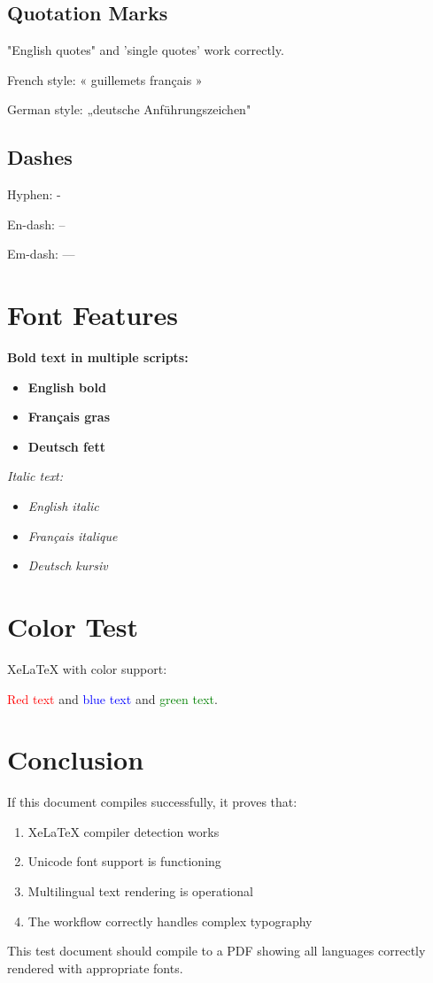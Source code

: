 \documentclass[12pt,a4paper]{article}
\begin{document}
\subsection{Quotation Marks}
"English quotes" and 'single quotes' work correctly.

French style: « guillemets français »

German style: „deutsche Anführungszeichen"

\subsection{Dashes}
Hyphen: -

En-dash: --

Em-dash: ---

\section{Font Features}

\textbf{Bold text in multiple scripts:}
\begin{itemize}
    \item \textbf{English bold}
    \item \textbf{Français gras}
    \item \textbf{Deutsch fett}
\end{itemize}

\textit{Italic text:}
\begin{itemize}
    \item \textit{English italic}
    \item \textit{Français italique}
    \item \textit{Deutsch kursiv}
\end{itemize}

\section{Color Test}

XeLaTeX with color support:

\textcolor{red}{Red text} and \textcolor{blue}{blue text} and \textcolor{green}{green text}.

\section{Conclusion}

If this document compiles successfully, it proves that:
\begin{enumerate}
    \item XeLaTeX compiler detection works
    \item Unicode font support is functioning
    \item Multilingual text rendering is operational
    \item The workflow correctly handles complex typography
\end{enumerate}

This test document should compile to a PDF showing all languages correctly rendered with appropriate fonts.
\end{document}
